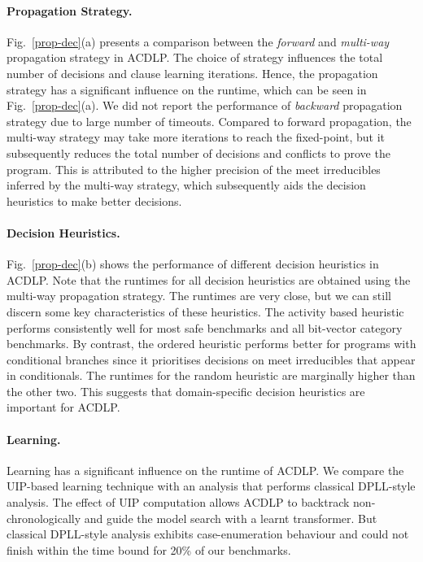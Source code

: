 \paragraph{Propagation Strategy.}
%
Fig.~\ref{prop-dec}(a) presents a comparison between the {\em forward} 
and {\em multi-way} propagation strategy in ACDLP.  The
choice of strategy influences the total number of decisions and clause 
learning iterations.  Hence, the propagation strategy has a
significant influence on the runtime, which can be seen in
Fig.~\ref{prop-dec}(a).  We did not report the performance 
of {\em backward} propagation strategy due to large 
number of timeouts.  Compared to forward propagation, the multi-way
strategy may take more iterations to reach the fixed-point, but it
subsequently reduces the total number of decisions and conflicts to prove the
program.  This is attributed to the higher precision of the meet irreducibles 
inferred by the multi-way strategy, which subsequently aids the decision 
heuristics to make better decisions.  

\paragraph{Decision Heuristics.}
%
Fig.~\ref{prop-dec}(b) shows the performance of different decision
heuristics in ACDLP.  Note that the runtimes for all decision heuristics are
obtained using the multi-way propagation strategy.  The runtimes are very
close, but we can still discern some key characteristics of these
heuristics.  The activity based heuristic performs consistently well for most safe
benchmarks and all bit-vector category benchmarks.  By contrast, the ordered
heuristic performs better for programs with conditional branches since it
prioritises decisions on meet irreducibles that appear in conditionals.  The
runtimes for the random heuristic are marginally higher than the other
two.  This suggests that domain-specific decision heuristics are important
for ACDLP.
%

\paragraph{Learning.}
%
Learning has a significant influence on the runtime of ACDLP.  We compare
the UIP-based learning technique with an analysis that performs classical 
DPLL-style analysis.
The effect of UIP computation allows ACDLP to backtrack non-chronologically 
and guide the model search with a learnt transformer.  But classical 
DPLL-style analysis exhibits case-enumeration behaviour and could not finish 
within the time bound for 20\% of our benchmarks.
%
